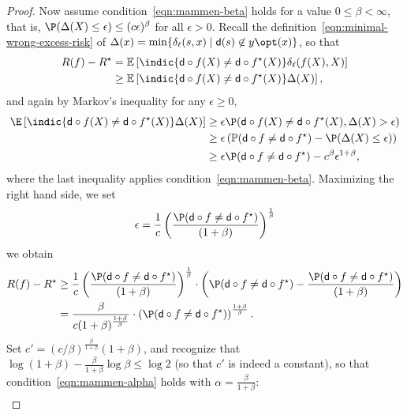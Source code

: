 \documentclass[11pt]{article}
\newcommand{\prn}[1]{\left({#1}\right)} %
\newcommand{\brk}[1]{\left[{#1}\right]} %
\newcommand{\pred}{\mathsf{d}}  %
\newcommand{\tloss}{\ell}  %
\newcommand{\extloss}{\delta_\tloss}
\begin{document}
\begin{proof}
  Now assume condition~\eqref{eqn:mammen-beta} holds for a value $0 \le \beta
  < \infty$, that is, $\P(\Delta(X) \leq \epsilon) \leq (c \epsilon)^\beta$
  for all $\epsilon > 0$.
  Recall the definition~\eqref{eqn:minimal-wrong-excess-risk}
  of $\Delta(x) = \min\{\extloss(s, x)
  \mid \pred(s) \not \in y\opt(x)\}$,
  so that
  \begin{align*}
    R(f) - R^\star
    & = \mathbb{E} \brk{\indic{\pred \circ f(X) \neq \pred \circ f^\star(X)}
      \extloss(f(X),X) } \\
    & \geq \mathbb{E} \brk{\indic{\pred \circ f(X) \neq \pred \circ f^\star(X)}
      \Delta(X) },
  \end{align*}
  and again by Markov's inequality for any $\epsilon \ge 0$,
  \begin{align}
    \E \brk{\indic{\pred \circ f(X) \neq \pred \circ f^\star(X)} \Delta(X)}
    & \geq  \epsilon \P(\pred \circ f(X) \neq \pred \circ f^\star(X),
    \Delta(X) > \epsilon) \nonumber \\
    & \geq \epsilon \prn{\mathbb{P}(\pred \circ f \neq \pred \circ f^\star)
      - \P(\Delta(X) \leq \epsilon)} \label{eqn:pinto-noir} \\
    & \geq \epsilon \P(\pred \circ f \neq \pred \circ f^\star)
    - c^\beta \epsilon^{1+\beta}, \nonumber
  \end{align}
  where the last inequality applies condition~\eqref{eqn:mammen-beta}.
  Maximizing the right hand side, we set
  \begin{align*}
    \epsilon = \frac{1}{c}\prn{\frac{\P(\pred \circ f \neq \pred \circ f^\star)}{
        (1+\beta)}}^{\frac{1}{\beta}}
  \end{align*}
  we obtain
  \begin{align*}
    R(f) - R^\star
    & \geq \frac{1}{c}
    \prn{\frac{\P(\pred \circ f \neq \pred \circ f^\star)}{
        (1+\beta)}}^{\frac{1}{\beta}}
    \cdot \prn{ \P(\pred \circ f \neq \pred \circ f^\star)
      - \frac{\P(\pred \circ f \neq \pred \circ f^\star)}{(1+\beta)}} \\
    & = \frac{\beta}{c(1+\beta)^{\frac{1+\beta}{\beta}}} \cdot
    \prn{\P(\pred \circ f \neq \pred \circ f^\star)}^{\frac{1 + \beta}{\beta}}.
  \end{align*}
  Set $c' = (c/\beta)^{\frac{\beta}{1+\beta}}(1+\beta)$,
  and recognize that $\log(1 + \beta) - \frac{\beta}{1 + \beta} \log \beta
  \le \log 2$ (so that $c'$ is indeed a constant),
  so that condition~\eqref{eqn:mammen-alpha} holds
  with $\alpha = \frac{\beta}{1 + \beta}$:
  \begin{align*}

\end{align*}
\end{proof}
\end{document}
